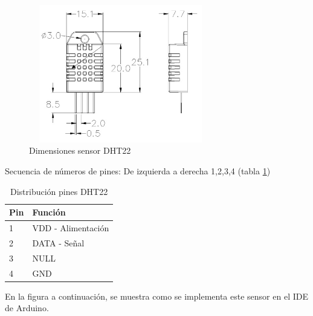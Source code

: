 \begin{figure}[H]
    \centering
    \includegraphics[width=8cm, height=6cm]{imagenes/dht22 dimensiones.jpg}
    \caption{Dimensiones sensor DHT22}
    \label{imag:dimensiones_dht22}
\end{figure}

\newpage

Secuencia de números de pines: De izquierda a derecha 1,2,3,4 (tabla \ref{tab:pines_DHT})

\begin{table}[H]
    \centering
    \caption{Distribución pines DHT22}
    \label{tab:pines_DHT}
    \begin{tabular}{|l|l|}
    \hline
    Pin & Función            \\ \hline
    1   & VDD - Alimentación \\ \hline
    2   & DATA - Señal       \\ \hline
    3   & NULL               \\ \hline
    4   & GND                \\ \hline
    \end{tabular}
\end{table}

En la figura a continuación, se muestra como se implementa este sensor en el IDE de Arduino.

